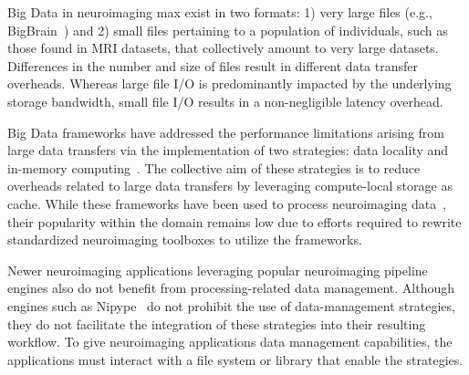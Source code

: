 \documentclass[fleqn,10pt]{wlscirep}
\newcommand{\TG}[1]{\todo[color=green!60!black]{\textbf{\textsc{From Tristan:}} #1\xspace}}
\begin{document}
    Big Data in neuroimaging max exist in two formats: 1) very large files
    (e.g., BigBrain~\cite{amunts2013bigbrain}) and 2) small files pertaining to a
    population of individuals, such as those found in MRI datasets, that
    collectively amount to very large datasets. Differences in the number and
    size of files result in different data transfer overheads. Whereas large
    file I/O is predominantly impacted by the underlying storage bandwidth,
    small file I/O results in a non-negligible latency overhead. 

    Big Data frameworks have addressed the performance limitations arising from large data transfers via the
    implementation of two strategies: data locality and in-memory computing~\cite{zaharia2016apache, rocklin2015dask}.
    The collective aim of these strategies is to reduce overheads related to large data
    transfers by leveraging compute-local storage as cache.
    While these frameworks have been used
    to process neuroimaging data~\cite{rokem2021pan,thunder,boubela2016big},
    their popularity within the domain remains low due to efforts required to
    rewrite standardized neuroimaging toolboxes to utilize the frameworks.
    
    Newer neuroimaging applications leveraging popular neuroimaging pipeline engines
    also do not benefit from processing-related data management.
    Although engines such as Nipype~\cite{nipype}
    do not prohibit the use of data-management
    strategies, they do not facilitate the integration of these strategies into
    their resulting workflow. To give
    neuroimaging applications data management capabilities, the applications
    must interact with a file system or library that enable the strategies.

\end{document}
